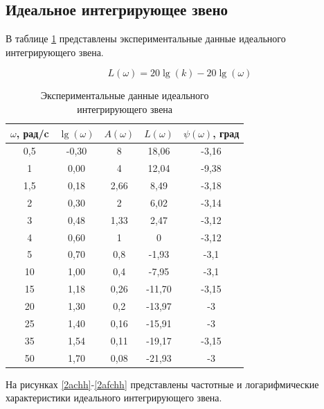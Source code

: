 \documentclass[a4paper, 12pt]{article}
\begin{document}
\newpage
\begin{center}
	\section{Идеальное интегрирующее звено}
\end{center}\par
В таблице \ref{tab:integr} представлены экспериментальные данные идеального интегрирующего звена.

\begin{equation}
	L(\omega) = 20\lg(k)-20\lg(\omega)
\end{equation}

\begin{table}[h]
	\caption{Экспериментальные данные идеального интегрирующего звена}
	\label{tab:integr}
	\begin{tabular}{|c|c|c|c|c|}
		\hline
		$\omega$, рад/c   & $\lg(\omega)$   & $A(\omega)$ & $L(\omega)$   & $\psi(\omega)$, град   \\
		\hline
		0,5 & -0,30 & 8    & 18,06   & -3,16 \\
		\hline
		1   & 0,00  & 4    & 12,04   & -9,38 \\
		\hline
		1,5 & 0,18  & 2,66 & 8,49   & -3,18 \\
		\hline
		2   & 0,30  & 2    & 6,02    & -3,14 \\
		\hline
		3   & 0,48  & 1,33 & 2,47    & -3,12 \\
		\hline
		4   & 0,60  & 1    & 0              & -3,12 \\
		\hline
		5   & 0,70  & 0,8  & -1,93    & -3,1  \\
		\hline
		10  & 1,00  & 0,4  & -7,95   & -3,1  \\
		\hline
		15  & 1,18  & 0,26 & -11,70   & -3,15 \\
		\hline
		20  & 1,30  & 0,2  & -13,97   & -3    \\
		\hline
		25  & 1,40  & 0,16 & -15,91   & -3    \\
		\hline
		35  & 1,54  & 0,11 & -19,17    & -3,15 \\
		\hline
		50  & 1,70  & 0,08 & -21,93   & -3   \\
		\hline
	\end{tabular}
\end{table}

На рисунках \ref{2achh}-\ref{2afchh} представлены частотные и логарифмические характеристики идеального интегрирующего звена.

\newpage
\end{document}
